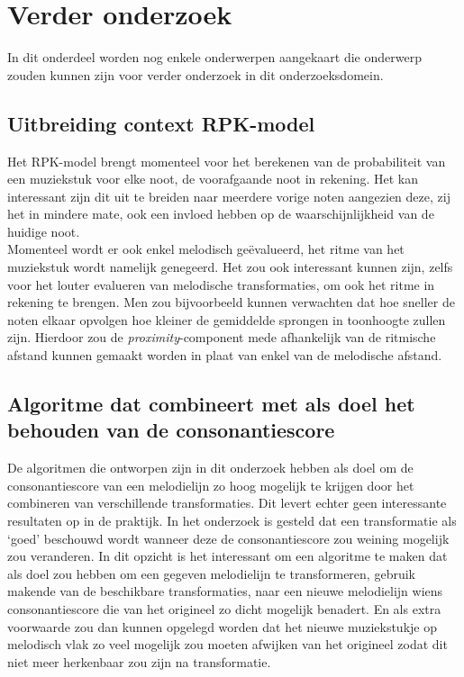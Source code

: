 \section{Verder onderzoek}
In dit onderdeel worden nog enkele onderwerpen aangekaart die onderwerp zouden kunnen zijn voor verder onderzoek in dit onderzoeksdomein.

\subsection{Uitbreiding context RPK-model}
Het RPK-model brengt momenteel voor het berekenen van de probabiliteit van een muziekstuk voor elke noot, de voorafgaande noot in rekening. Het kan interessant zijn dit uit te breiden naar meerdere vorige noten aangezien deze, zij het in mindere mate, ook een invloed hebben op de waarschijnlijkheid van de huidige noot.\\
Momenteel wordt er ook enkel melodisch ge\"evalueerd, het ritme van het muziekstuk wordt namelijk genegeerd. Het zou ook interessant kunnen zijn, zelfs voor het louter evalueren van melodische transformaties, om ook het ritme in rekening te brengen. Men zou bijvoorbeeld kunnen verwachten dat hoe sneller de noten elkaar opvolgen hoe kleiner de gemiddelde sprongen in toonhoogte zullen zijn. Hierdoor zou de \textit{proximity}-component mede afhankelijk van de ritmische afstand kunnen gemaakt worden in plaat van enkel van de melodische afstand.

\subsection{Algoritme dat combineert met als doel het behouden van de consonantiescore}
De algoritmen die ontworpen zijn in dit onderzoek hebben als doel om de consonantiescore van een melodielijn zo hoog mogelijk te krijgen door het combineren van verschillende transformaties. Dit levert echter geen interessante resultaten op in de praktijk. In het onderzoek is gesteld dat een transformatie als `goed' beschouwd wordt wanneer deze de consonantiescore zou weining mogelijk zou veranderen. In dit opzicht is het interessant om een algoritme te maken dat als doel zou hebben om een gegeven melodielijn te transformeren, gebruik makende van de beschikbare transformaties, naar een nieuwe melodielijn wiens consonantiescore die van het origineel zo dicht mogelijk benadert. En als extra voorwaarde zou dan kunnen opgelegd worden dat het nieuwe muziekstukje op melodisch vlak zo veel mogelijk zou moeten afwijken van het origineel zodat dit niet meer herkenbaar zou zijn na transformatie.

